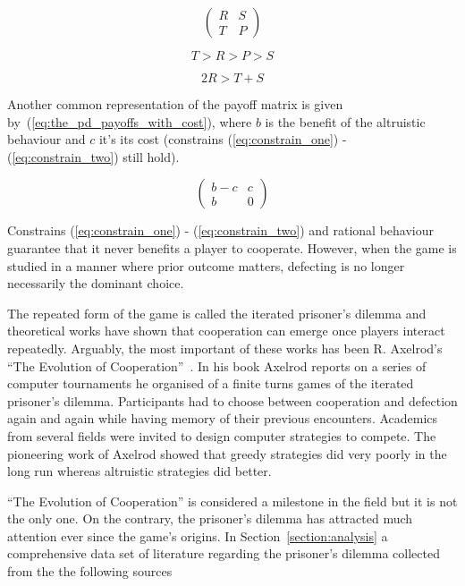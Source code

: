 \documentclass{article}
\theoremstyle{definition}
\begin{document}
\begin{equation} \label{eq:the_pd_payoffs}
    \begin{pmatrix}
    R & S \\ T & P
    \end{pmatrix}
\end{equation}

\begin{equation}\label{eq:constrain_one}
    T > R > P > S
\end{equation}

\begin{equation}\label{eq:constrain_two}
    2R > T + S
\end{equation}

Another common representation of the payoff matrix is given by~(\ref{eq:the_pd_payoffs_with_cost}),
where \(b\) is the benefit of the altruistic behaviour and \(c\) it's its cost
(constrains (\ref{eq:constrain_one}) - (\ref{eq:constrain_two}) still hold).

\begin{equation}\label{eq:the_pd_payoffs_with_cost}
    \begin{pmatrix}
        b - c & c \\ b & 0
    \end{pmatrix}
\end{equation}

Constrains (\ref{eq:constrain_one}) - (\ref{eq:constrain_two}) and rational behaviour
guarantee that it never benefits a player to cooperate. However,
when the game is studied in a manner where prior outcome matters,
defecting is no longer necessarily the dominant choice.

The repeated form of the game is called the iterated prisoner's dilemma and theoretical
works have shown that cooperation can emerge once players interact repeatedly.
Arguably, the most important of these works has been R. Axelrod's
``The Evolution of Cooperation''~\cite{Axelrod1984}.
In his book Axelrod reports on a series of computer tournaments he organised of
a finite turns games of the iterated prisoner's dilemma. Participants
had to choose between cooperation and defection again and again while having
memory of their previous encounters. Academics from several fields were invited to
design computer strategies to compete. The pioneering work of Axelrod
showed that greedy strategies did very poorly in the long run whereas altruistic
strategies did better.

``The Evolution of Cooperation'' is considered a milestone in the field but it
is not the only one. On the contrary, the prisoner's dilemma has attracted much
attention ever since the game's origins. In Section~\ref{section:analysis} a comprehensive
data set of literature regarding the prisoner's dilemma collected from the
the following sources
\end{document}
